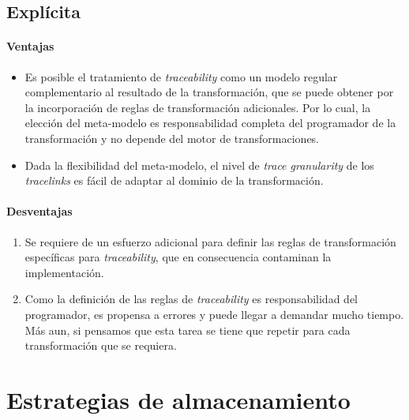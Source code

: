 \documentclass[a4paper,12pt,oneside,spanish]{book}
\begin{document}
\subsection{Explícita}

\paragraph{Ventajas}

\begin{itemize}[label={\checkmark}]

\item Es posible el tratamiento de \textit{traceability} como un modelo regular complementario al resultado de la transformación, que se puede obtener por la incorporación de reglas de transformación adicionales. Por lo cual, la elección del meta-modelo es responsabilidad completa del programador de la transformación y no depende del motor de transformaciones. 

\item Dada la flexibilidad del meta-modelo, el nivel de \textit{trace granularity} de los \textit{tracelinks} es fácil de adaptar al dominio de la transformación.

\end{itemize}

\paragraph{Desventajas}

\begin{enumerate}

\item Se requiere de un esfuerzo adicional para definir las reglas de transformación específicas para \textit{traceability}, que en consecuencia contaminan la implementación.

\item Como la definición de las reglas de \textit{traceability} es responsabilidad del programador, es propensa a errores y puede llegar a demandar mucho tiempo. Más aun, si pensamos que esta tarea se tiene que repetir para cada transformación que se requiera.

\end{enumerate}


\section{Estrategias de almacenamiento}
\end{document}
